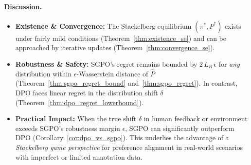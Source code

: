 \paragraph{Discussion.}
\begin{itemize}
\item \textbf{Existence \& Convergence:}  
The Stackelberg equilibrium \((\pi^*,P^*)\) exists under fairly mild conditions (Theorem~\ref{thm:existence_se}) and can be approached by iterative updates (Theorem~\ref{thm:convergence_se}).

\item \textbf{Robustness \& Safety:}  
SGPO’s regret remains bounded by \(2\,L_R\,\epsilon\) for \emph{any} distribution within \(\epsilon\)-Wasserstein distance of \(\hat{P}\) (Theorem~\ref{thm:sgpo_regret_bound} and~\ref{thm:sgpo_regret}).  In contrast, DPO faces linear regret in the distribution shift \(\delta\) (Theorem~\ref{thm:dpo_regret_lowerbound}).

\item \textbf{Practical Impact:}  
When the true shift \(\delta\) in human feedback or environment exceeds SGPO’s robustness margin \(\epsilon\), SGPO can significantly outperform DPO (Corollary~\ref{cor:dpo_vs_sgpo}).  This underlies the advantage of a \emph{Stackelberg game perspective} for preference alignment in real-world scenarios with imperfect or limited annotation data.
\end{itemize}


